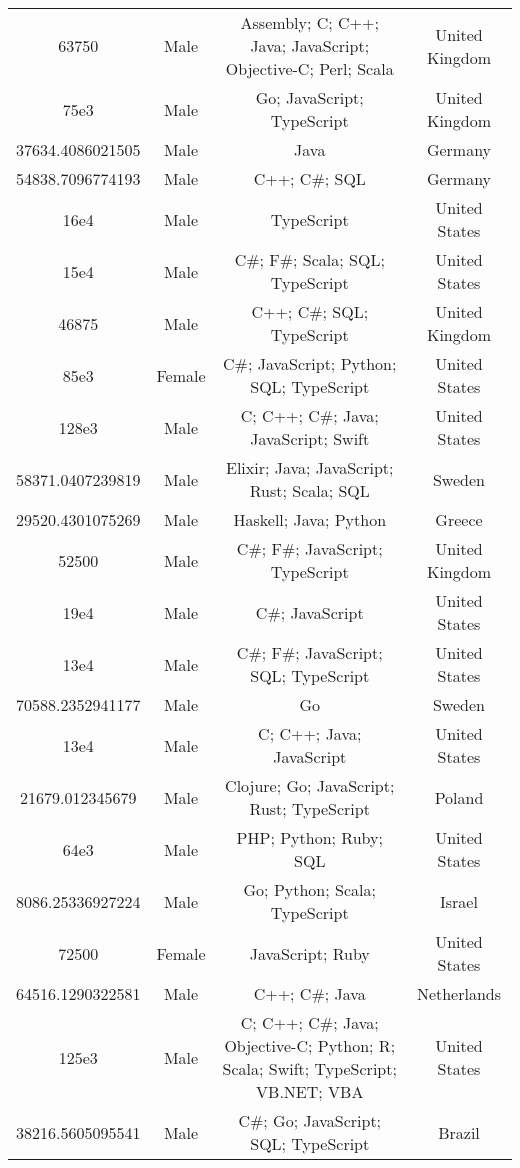 \begin{center}
\begin{tabular}{ |c|c|c|c| }
63750  &  Male  &  Assembly; C; C++; Java; JavaScript; Objective-C; Perl; Scala  &  United Kingdom  \\ 
75e3  &  Male  &  Go; JavaScript; TypeScript  &  United Kingdom  \\ 
37634.4086021505  &  Male  &  Java  &  Germany  \\ 
54838.7096774193  &  Male  &  C++; C\#; SQL  &  Germany  \\ 
16e4  &  Male  &  TypeScript  &  United States  \\ 
15e4  &  Male  &  C\#; F\#; Scala; SQL; TypeScript  &  United States  \\ 
46875  &  Male  &  C++; C\#; SQL; TypeScript  &  United Kingdom  \\ 
85e3  &  Female  &  C\#; JavaScript; Python; SQL; TypeScript  &  United States  \\ 
128e3  &  Male  &  C; C++; C\#; Java; JavaScript; Swift  &  United States  \\ 
58371.0407239819  &  Male  &  Elixir; Java; JavaScript; Rust; Scala; SQL  &  Sweden  \\ 
29520.4301075269  &  Male  &  Haskell; Java; Python  &  Greece  \\ 
52500  &  Male  &  C\#; F\#; JavaScript; TypeScript  &  United Kingdom  \\ 
19e4  &  Male  &  C\#; JavaScript  &  United States  \\ 
13e4  &  Male  &  C\#; F\#; JavaScript; SQL; TypeScript  &  United States  \\ 
70588.2352941177  &  Male  &  Go  &  Sweden  \\ 
13e4  &  Male  &  C; C++; Java; JavaScript  &  United States  \\ 
21679.012345679  &  Male  &  Clojure; Go; JavaScript; Rust; TypeScript  &  Poland  \\ 
64e3  &  Male  &  PHP; Python; Ruby; SQL  &  United States  \\ 
8086.25336927224  &  Male  &  Go; Python; Scala; TypeScript  &  Israel  \\ 
72500  &  Female  &  JavaScript; Ruby  &  United States  \\ 
64516.1290322581  &  Male  &  C++; C\#; Java  &  Netherlands  \\ 
125e3  &  Male  &  C; C++; C\#; Java; Objective-C; Python; R; Scala; Swift; TypeScript; VB.NET; VBA  &  United States  \\ 
38216.5605095541  &  Male  &  C\#; Go; JavaScript; SQL; TypeScript  &  Brazil  \\ 

\end{tabular}
\end{center}
